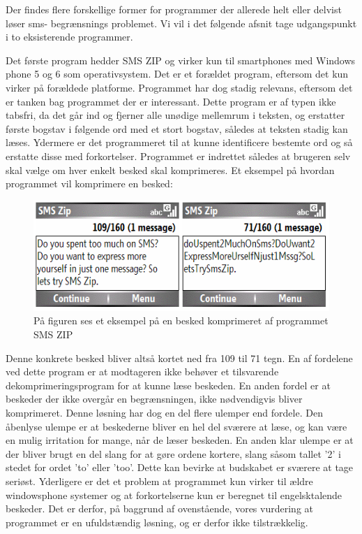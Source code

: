Der findes flere forskellige former for programmer der allerede helt eller delvist løser sms- begrænsnings problemet. Vi vil i det følgende afsnit tage udgangspunkt i to eksisterende programmer.

Det første program hedder SMS ZIP og virker kun til smartphones med Windows phone 5 og 6 som operativsystem. Det er et forældet program, eftersom det kun virker på forældede platforme. Programmet har dog stadig relevans,  eftersom det er tanken bag programmet der er interessant. Dette program er af typen ikke tabsfri, da det går ind og fjerner alle unødige mellemrum i teksten, og erstatter første bogstav i følgende ord med et stort bogstav, således at teksten stadig kan læses. Ydermere er det programmeret til at kunne identificere bestemte ord og så erstatte disse med forkortelser. Programmet er indrettet således at brugeren selv skal vælge om hver enkelt besked skal komprimeres. Et eksempel på hvordan programmet vil komprimere en besked: \cite{download-sms} 

\begin{figure}[H]
\includegraphics []{Billeder/SMSZIP.png}
\caption {På figuren ses et eksempel på en besked komprimeret af programmet SMS ZIP}
\end{figure}

Denne konkrete besked bliver altså kortet ned fra 109 til 71 tegn. En af fordelene ved dette program er at modtageren ikke behøver et tilsvarende dekomprimeringsprogram for at kunne læse beskeden. En anden fordel er at beskeder der ikke overgår en begrænsningen, ikke nødvendigvis bliver komprimeret. Denne løsning har dog en del flere ulemper end fordele. Den åbenlyse ulempe er at beskederne bliver en hel del sværere at læse, og kan være en mulig irritation for mange, når de læser beskeden. En anden klar ulempe er at der bliver brugt en del slang for at gøre ordene kortere, slang såsom tallet '2' i stedet for ordet 'to' eller 'too'. Dette kan bevirke at budskabet er sværere at tage seriøst. Yderligere er det et problem at programmet kun virker til ældre windowsphone systemer og at forkortelserne kun er beregnet til engelsktalende beskeder. Det er derfor, på baggrund af ovenstående, vores vurdering at programmet er en ufuldstændig løsning, og er derfor ikke tilstrækkelig.\cite{download-sms}

